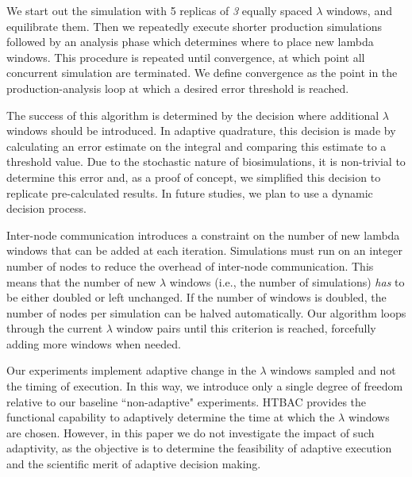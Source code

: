 We start out the simulation with 5 replicas of \emph{3}  equally spaced $\lambda$ windows, and equilibrate them. Then we
repeatedly execute shorter production simulations followed by an analysis
phase which determines where to place new lambda windows. This procedure is
repeated until convergence, at which point all concurrent simulation are
terminated. We define convergence as the point in the production-analysis
loop at which a desired error threshold is reached.

The success of this algorithm is determined by the decision where additional
$\lambda$ windows should be introduced. In adaptive quadrature, this decision
is made by calculating an error estimate on the integral and comparing this
estimate to a threshold value. Due to the stochastic nature of
biosimulations, it is non-trivial to determine this error and, as a proof of
concept, we simplified this decision to replicate pre-calculated results. In
future studies, we plan to use a dynamic decision process.

Inter-node communication introduces a constraint on the number of new lambda
windows that can be added at each iteration. Simulations must run on an
integer number of nodes to reduce the overhead of inter-node communication.
This means that the number of new $\lambda$ windows (i.e., the number of
simulations) \emph{has} to be either doubled or left unchanged. If the number
of windows is doubled, the number of nodes per simulation can be halved
automatically. Our algorithm loops through the current $\lambda$ window pairs
until this criterion is reached, forcefully adding more windows when needed.




Our experiments implement adaptive change in the $\lambda$ windows sampled
and not the timing of execution. In this way, we introduce only a single
 degree of freedom relative to  our
baseline ``non-adaptive" experiments. HTBAC provides the functional
capability to adaptively determine the time at which the $\lambda$ windows
are chosen. However, in this paper we do not investigate the impact of such
adaptivity, as the objective is to determine the feasibility of adaptive
execution and the scientific merit of adaptive decision making.

